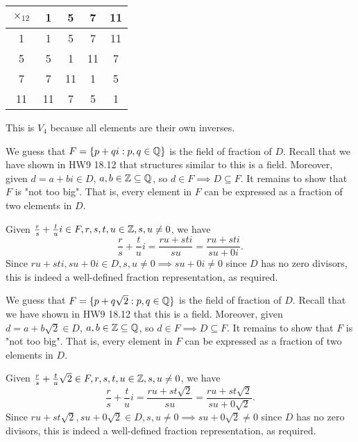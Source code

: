 \documentclass[12pt]{article}
\begin{document}
\begin{problem}[20.24]
\begin{table}[H]
	\centering
	\begin{tabular}{c||c|c|c|c}
		$ \times _{12}$ &1&5&7&11\\
		\hline
		\hline
		1&1&5&7&11\\
		\hline
		5&5&1&11&7\\
		\hline
		7&7&11&1&5\\
		\hline
		11 &11&7&5&1\\
	\end{tabular}
\end{table}
This is $ V_4$ because all elements are their own inverses.
\end{problem}

\begin{problem}[21.1]
	We guess that $ F= \{p+qi : p,q \in \mathbb{Q}\} $ is the field of fraction of $ D$. Recall that we have shown in HW9 18.12 that structures similar to this is a field. Moreover, given $ d = a+bi \in D$, $ a,b \in \mathbb{Z} \subseteq \mathbb{Q}$, so $ d \in F \implies D \subseteq F$. It remains to show that $ F$ is "not too big". That is, every element in  $ F$ can be expressed as a fraction of two elements in  $ D$.

	Given  $ \frac{r}{s}+\frac{t}{u} i \in F, r,s,t,u \in \mathbb{Z}, s,u \neq 0$, we have
	\[
	\frac{r}{s}+\frac{t}{u} i = \frac{ru+ sti}{su }= \frac{ru+sti}{su+0i }
	.\] 
	Since $ ru+sti, su+0i \in D, s,u\neq 0 \implies su+0i \neq 0$ since $ D$ has no zero divisors, this is indeed a well-defined fraction representation, as required.
\end{problem}

\begin{problem}[21.2]
	We guess that $ F= \{p+q\sqrt{2}  : p,q \in \mathbb{Q}\} $ is the field of fraction of $ D$. Recall that we have shown in HW9 18.12 that this is a field. Moreover, given $ d = a+b\sqrt{2}  \in D$, $ a,b \in \mathbb{Z} \subseteq \mathbb{Q}$, so $ d \in F \implies D \subseteq F$. It remains to show that $ F$ is "not too big". That is, every element in  $ F$ can be expressed as a fraction of two elements in  $ D$.

	Given  $ \frac{r}{s}+\frac{t}{u} \sqrt{2}  \in F, r,s,t,u \in \mathbb{Z}, s,u \neq 0$, we have
	\[
	\frac{r}{s}+\frac{t}{u} i = \frac{ru+ st \sqrt{2} }{su }= \frac{ru+st \sqrt{2} }{su+0 \sqrt{2}  }
	.\] 
	Since $ ru+st \sqrt{2} , su+0 \sqrt{2}  \in D, s,u\neq 0 \implies su+0 \sqrt{2}  \neq 0$ since $ D$ has no zero divisors, this is indeed a well-defined fraction representation, as required.
\
\end{problem}
\end{document}
